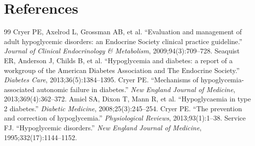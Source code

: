 \section*{References}
\begin{thebibliography}{99}
 Cryer PE, Axelrod L, Grossman AB, et al. ``Evaluation and management of adult hypoglycemic disorders: an Endocrine Society clinical practice guideline.'' \textit{Journal of Clinical Endocrinology \& Metabolism}, 2009;94(3):709--728.
 Seaquist ER, Anderson J, Childs B, et al. ``Hypoglycemia and diabetes: a report of a workgroup of the American Diabetes Association and The Endocrine Society.'' \textit{Diabetes Care}, 2013;36(5):1384--1395.
 Cryer PE. ``Mechanisms of hypoglycemia-associated autonomic failure in diabetes.'' \textit{New England Journal of Medicine}, 2013;369(4):362--372.
 Amiel SA, Dixon T, Mann R, et al. ``Hypoglycaemia in type 2 diabetes.'' \textit{Diabetic Medicine}, 2008;25(3):245--254.
 Cryer PE. ``The prevention and correction of hypoglycemia.'' \textit{Physiological Reviews}, 2013;93(1):1--38.
 Service FJ. ``Hypoglycemic disorders.'' \textit{New England Journal of Medicine}, 1995;332(17):1144--1152.

\end{thebibliography}
